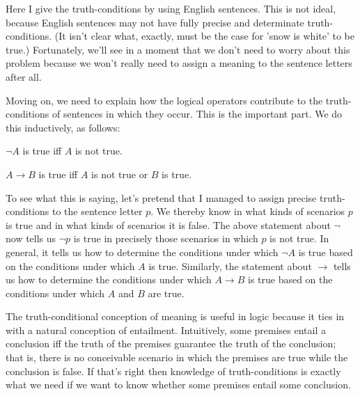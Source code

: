 Here I give the truth-conditions by using English sentences.
This is not ideal,
because English sentences may not have fully precise and determinate truth-conditions.
(It isn't clear what, exactly, must be the case for 'snow is white' to be true.) Fortunately,
we'll see in a moment that
we don't need to worry about this problem
because we won't really need to assign a meaning to the sentence letters after all.


Moving on,
we need to explain how the logical operators contribute to the
truth-conditions of sentences in which they occur.
This is the important part.
We do this inductively,
as follows:

\begin{enumerate*}
\item[(i)] $\neg A$ is true iff $A$ is not true.
\item[(ii)] $A \to B$ is true iff $A$ is not true or $B$ is true.
\end{enumerate*}

To see what this is saying,
let's pretend that I managed to assign precise truth-conditions to the sentence letter $p$.
We thereby know
in what kinds of scenarios $p$ is true and in what kinds of scenarios it is false.
The above statement about $\neg$ now tells us $\neg p$ is true in
precisely those scenarios in which $p$ is not true.
In general,
it tells us how to determine the conditions under which $\neg A$ is true
based on the conditions under which $A$ is true.
Similarly,
the statement about $\to$ tells us how to determine
the conditions under which $A \to B$ is true
based on the conditions under which $A$ and $B$ are true.


The truth-conditional conception of meaning is useful in logic because
it ties in with a natural conception of entailment.
Intuitively, some premises entail a conclusion iff
the truth of the premises guarantee the truth of the conclusion;
that is,
there is no conceivable scenario in which the premises
are true while the conclusion is false.
If that's right then
knowledge of truth-conditions is exactly what we need
if we want to know whether some premises entail some conclusion.

